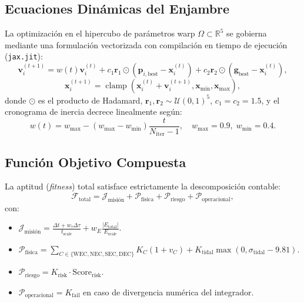 \documentclass[11pt,a4paper]{article}
\begin{document}
\subsection{Ecuaciones Dinámicas del Enjambre}
La optimización en el hipercubo de parámetros warp $\Omega \subset \mathbb{R}^5$ se gobierna mediante una formulación vectorizada con compilación en tiempo de ejecución (\texttt{jax.jit}):
\begin{equation}
    \mathbf{v}_i^{(t+1)} = w(t) \mathbf{v}_i^{(t)} + c_1 \mathbf{r}_1 \odot \left(\mathbf{p}_{i, \text{best}} - \mathbf{x}_i^{(t)}\right) + c_2 \mathbf{r}_2 \odot \left(\mathbf{g}_{\text{best}} - \mathbf{x}_i^{(t)}\right),
\end{equation}
\begin{equation}
    \mathbf{x}_i^{(t+1)} = \operatorname{clamp}\left(\mathbf{x}_i^{(t)} + \mathbf{v}_i^{(t+1)}, \mathbf{x}_{\min}, \mathbf{x}_{\max}\right),
\end{equation}
donde $\odot$ es el producto de Hadamard, $\mathbf{r}_1, \mathbf{r}_2 \sim \mathcal{U}(0, 1)^5$, $c_1 = c_2 = 1.5$, y el cronograma de inercia decrece linealmente según:
\begin{equation}
    w(t) = w_{\max} - (w_{\max} - w_{\min}) \frac{t}{N_{\text{iter}} - 1}, \quad w_{\max} = 0.9, \; w_{\min} = 0.4.
\end{equation}

\subsection{Función Objetivo Compuesta}
La aptitud (\textit{fitness}) total satisface estrictamente la descomposición contable:
\begin{equation}
    \mathcal{F}_{\text{total}} = \mathcal{J}_{\text{misión}} + \mathcal{P}_{\text{física}} + \mathcal{P}_{\text{riesgo}} + \mathcal{P}_{\text{operacional}},
\end{equation}
con:
\begin{itemize}
    \item $\mathcal{J}_{\text{misión}} = \frac{\Delta t + w_\tau \Delta \tau}{t_{\text{scale}}} + w_E \frac{|E_{\text{total}}|}{E_{\text{scale}}}$.
    \item $\mathcal{P}_{\text{física}} = \sum_{C \in \{\text{WEC}, \text{NEC}, \text{SEC}, \text{DEC}\}} K_C (1 + v_C) + K_{\text{tidal}} \max(0, \sigma_{\text{tidal}} - 9.81)$.
    \item $\mathcal{P}_{\text{riesgo}} = K_{\text{risk}} \cdot \text{Score}_{\text{risk}}$.
    \item $\mathcal{P}_{\text{operacional}} = K_{\text{fail}}$ en caso de divergencia numérica del integrador.
\end{itemize}
\end{document}
